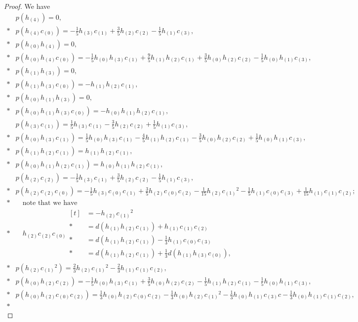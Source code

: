 \documentclass[12pt]{amsart}
\theoremstyle{definition}
\theoremstyle{remark}
\begin{document}
\begin{proof}
We have
\begin{align*}
&p(h_{(4)})=0,\\*
&p(h_{(4)}c_{(0)})=-\frac15h_{(3)}c_{(1)}+\frac35h_{(2)}c_{(2)}-\frac15h_{(1)}c_{(3)},\\*
&p(h_{(0)}h_{(4)})=0,\\*
&p(h_{(0)}h_{(4)}c_{(0)})=-\frac15h_{(0)}h_{(3)}c_{(1)}+\frac95h_{(1)}h_{(2)}c_{(1)}+\frac35h_{(0)}h_{(2)}c_{(2)}-\frac15h_{(0)}h_{(1)}c_{(3)},\\*
&p(h_{(1)}h_{(3)})=0,\\*
&p(h_{(1)}h_{(3)}c_{(0)})=-h_{(1)}h_{(2)}c_{(1)},\\*
&p(h_{(0)}h_{(1)}h_{(3)})=0,\\*
&p(h_{(0)}h_{(1)}h_{(3)}c_{(0)})=-h_{(0)}h_{(1)}h_{(2)}c_{(1)},\\
&p(h_{(3)}c_{(1)})=\frac15h_{(3)}c_{(1)}-\frac35h_{(2)}c_{(2)}+\frac15h_{(1)}c_{(3)},\\*
&p(h_{(0)}h_{(3)}c_{(1)})=\frac15h_{(0)}h_{(3)}c_{(1)}-\frac45h_{(1)}h_{(2)}c_{(1)}-\frac35h_{(0)}h_{(2)}c_{(2)}+\frac15h_{(0)}h_{(1)}c_{(3)},\\*
&p(h_{(1)}h_{(2)}c_{(1)})=h_{(1)}h_{(2)}c_{(1)},\\*
&p(h_{(0)}h_{(1)}h_{(2)}c_{(1)})=h_{(0)}h_{(1)}h_{(2)}c_{(1)},\\
&p(h_{(2)}c_{(2)})=-\frac15h_{(3)}c_{(1)}+\frac35h_{(2)}c_{(2)}-\frac15h_{(1)}c_{(3)},\\*
&p(h_{(2)}c_{(2)}c_{(0)})=-\frac15h_{(3)}c_{(0)}c_{(1)}+\frac35h_{(2)}c_{(0)}c_{(2)}-\frac1{15}h_{(2)}c_{(1)}{}^2-\frac15h_{(1)}c_{(0)}c_{(3)}+\frac1{15}h_{(1)}c_{(1)}c_{(2)};\\*
&\quad\text{note that we have}\\*
&\quad h_{(2)}c_{(2)}c_{(0)}\begin{aligned}[t]
&=-h_{(2)}c_{(1)}{}^2\\*
&=d(h_{(1)}h_{(2)}c_{(1)})+h_{(1)}c_{(1)}c_{(2)}\\*
&=d(h_{(1)}h_{(2)}c_{(1)})-\frac13h_{(1)}c_{(0)}c_{(3)}\\*
&=d(h_{(1)}h_{(2)}c_{(1)})+\frac13d(h_{(1)}h_{(3)}c_{(0)}),
\end{aligned}\\*
&p(h_{(2)}c_{(1)}{}^2)=\frac23h_{(2)}c_{(1)}{}^2-\frac23h_{(1)}c_{(1)}c_{(2)},\\*
&p(h_{(0)}h_{(2)}c_{(2)})=-\frac15h_{(0)}h_{(3)}c_{(1)}+\frac35h_{(0)}h_{(2)}c_{(2)}-\frac15h_{(1)}h_{(2)}c_{(1)}-\frac15h_{(0)}h_{(1)}c_{(3)},\\*
&p(h_{(0)}h_{(2)}c_{(0)}c_{(2)})=\frac13h_{(0)}h_{(2)}c_{(0)}c_{(2)}-\frac13h_{(0)}h_{(2)}c_{(1)}{}^2-\frac13h_{(0)}h_{(1)}c_{(3)}c-\frac13h_{(0)}h_{(1)}c_{(1)}c_{(2)},\\*

\end{align*}
\end{proof}
\end{document}
